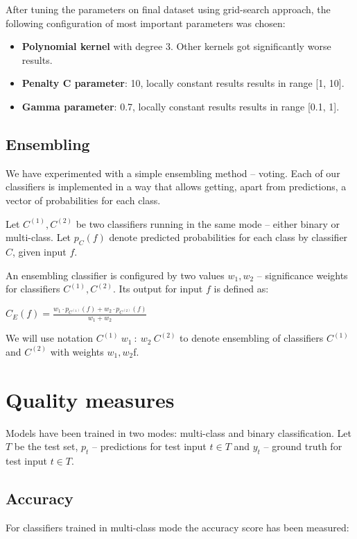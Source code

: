         After tuning the parameters on final dataset using grid-search approach, the following configuration of most important parameters was chosen:
        \begin{itemize}
            \item \textbf{Polynomial kernel} with degree 3. Other kernels got significantly worse results.
            \item \textbf{Penalty C parameter}: 10, locally constant results results in range [1, 10].
            \item \textbf{Gamma parameter}: 0.7, locally constant results results in range [0.1, 1].
        \end{itemize}

        \subsection{Ensembling}
        We have experimented with a simple ensembling method -- voting.
        Each of our classifiers is implemented in a way that allows getting,
        apart from predictions, a vector of probabilities for each class.

        Let $C^{(1)}, C^{(2)}$ be two classifiers running in the same mode -- either
        binary or multi-class.
        Let $p_{C}(f)$ denote predicted probabilities for each class by classifier $C$,
        given input $f$.

        An ensembling classifier is configured by two values $w_1, w_2$ -- significance
        weights for classifiers $C^{(1)}, C^{(2)}$. Its output for input $f$ is defined as:
        \begin{center}
        $C_{E}(f) = \frac{w_{1} \cdot p_{C^{(1)}}(f) + w_{2} \cdot p_{C^{(2)}}(f)}{w_{1} + w_{2}}$
        \end{center}

        We will use notation $C^{(1)}\ w_{1}\ :\ w_{2}\ C^{(2)}$ to denote ensembling
        of classifiers $C^{(1)}$ and $C^{(2)}$ with weights $w_{1}, w_{2}$f.


    \section{Quality measures}
        Models have been trained in two modes: multi-class and binary
        classification. Let $T$ be the test set, $p_t$ -- predictions for test input
        $t \in T$ and $y_t$ -- ground truth for test input $t \in T$.
        \subsection*{Accuracy}
        For classifiers trained in multi-class mode the accuracy score has been
        measured:

